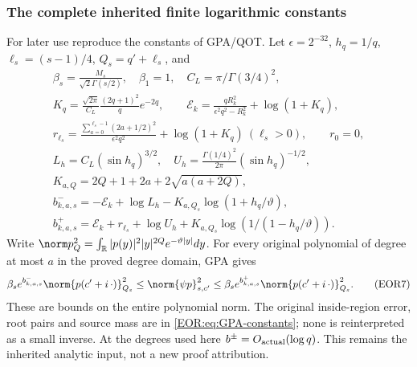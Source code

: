 \documentclass[11pt,a4paper]{article}
\providecommand{\R}{\mathbb R}
\begin{document}
\subsubsection{The complete inherited finite logarithmic constants}
For later use reproduce the constants of GPA/QOT. Let $\epsilon=2^{-32}$,
$h_q=1/q$, $\ell_s=(s-1)/4$, $Q_s=q'+\ell_s$, and
\begin{equation}
\begin{gathered}
 \beta_s=\frac{M_s}{\sqrt2\Gamma(s/2)},\quad\beta_1=1,
 \quad C_L=\pi/\Gamma(3/4)^2,\\
 K_q=\frac{\sqrt{2\pi}}{C_L}\frac{(2q+1)^2}{q}e^{-2q},\qquad
 \mathcal E_k=\frac{qR_k^2}{\epsilon^2q^2-R_k^2}+\log(1+K_q),\\
 r_{\ell_s}=\frac{\sum_{a=0}^{\ell_s-1}(2a+1/2)^2}{\epsilon^2q^2}
                  +\log(1+K_q)\ (\ell_s>0),\qquad r_0=0,\\
 L_h=C_L(\sin h_q)^{3/2},\quad
 U_h=\frac{\Gamma(1/4)^2}{2\pi}(\sin h_q)^{-1/2},\\
 K_{a,Q}=2Q+1+2a+2\sqrt{a(a+2Q)},\\
 b_{k,a,s}^{-}=-\mathcal E_k+\log L_h-K_{a,Q_s}\log(1+h_q/\vartheta),\\
 b_{k,a,s}^{+}=\mathcal E_k+r_{\ell_s}+\log U_h
                       +K_{a,Q_s}\log(1/(1-h_q/\vartheta)).
\end{gathered}\label{EOR:eq:GPA-constants}
\tag{EOR6}
\end{equation}
Write
$\norm p_{Q}^2=\int_\R|p(y)|^2|y|^{2Q}e^{-\vartheta|y|}dy$.
For every original polynomial of degree at most $a$ in the proved degree domain,
GPA gives
\begin{equation}
 \beta_s e^{b_{k,a,s}^{-}}\norm{p(c'+i\,\cdot)}_{Q_s}^2
 \le\norm{\psi p}_{s,c'}^2
 \le\beta_s e^{b_{k,a,s}^{+}}\norm{p(c'+i\,\cdot)}_{Q_s}^2.
 \label{EOR:eq:GPA}
\tag{EOR7}
\end{equation}
These are bounds on the entire polynomial norm. The original inside-region error,
root pairs and source mass are in \eqref{EOR:eq:GPA-constants}; none is reinterpreted as
a small inverse. At the degrees used here $b^\pm=O_{\rm actual}(\log q)$.
This remains the inherited analytic input, not a new proof attribution.
\end{document}
